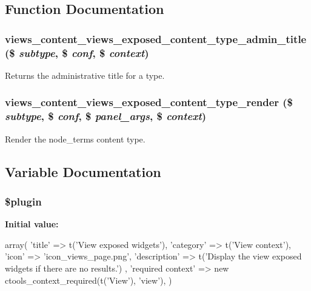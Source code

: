 \subsection{Function Documentation}
\hypertarget{views__exposed_8inc_a90e7230184d5e1f5e99dba0dedd4d139}{
\subsubsection[{views\_\-content\_\-views\_\-exposed\_\-content\_\-type\_\-admin\_\-title}]{\setlength{\rightskip}{0pt plus 5cm}views\_\-content\_\-views\_\-exposed\_\-content\_\-type\_\-admin\_\-title (\$ {\em subtype}, \/  \$ {\em conf}, \/  \$ {\em context})}}
\label{views__exposed_8inc_a90e7230184d5e1f5e99dba0dedd4d139}
Returns the administrative title for a type. \hypertarget{views__exposed_8inc_a21bf54aed443831f96497c0808a74aeb}{
\subsubsection[{views\_\-content\_\-views\_\-exposed\_\-content\_\-type\_\-render}]{\setlength{\rightskip}{0pt plus 5cm}views\_\-content\_\-views\_\-exposed\_\-content\_\-type\_\-render (\$ {\em subtype}, \/  \$ {\em conf}, \/  \$ {\em panel\_\-args}, \/  \$ {\em context})}}
\label{views__exposed_8inc_a21bf54aed443831f96497c0808a74aeb}
Render the node\_\-terms content type. 

\subsection{Variable Documentation}
\hypertarget{views__exposed_8inc_ada8a7130088351710bb02ed622d6bf65}{
\subsubsection[{\$plugin}]{\setlength{\rightskip}{0pt plus 5cm}\$plugin}}
\label{views__exposed_8inc_ada8a7130088351710bb02ed622d6bf65}
{\bfseries Initial value:}
\begin{DoxyCode}
 array(
  'title' => t('View exposed widgets'),
  'category' => t('View context'),
  'icon' => 'icon_views_page.png',
  'description' => t('Display the view exposed widgets if there are no results.')
      ,
  'required context' => new ctools_context_required(t('View'), 'view'),
)
\end{DoxyCode}
